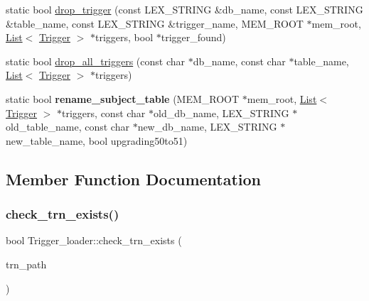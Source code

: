 \begin{DoxyCompactItemize}
\item 
static bool \mbox{\hyperlink{classTrigger__loader_af096f75cbf2411b74572fa71fa2f6612}{drop\+\_\+trigger}} (const L\+E\+X\+\_\+\+S\+T\+R\+I\+NG \&db\+\_\+name, const L\+E\+X\+\_\+\+S\+T\+R\+I\+NG \&table\+\_\+name, const L\+E\+X\+\_\+\+S\+T\+R\+I\+NG \&trigger\+\_\+name, M\+E\+M\+\_\+\+R\+O\+OT $\ast$mem\+\_\+root, \mbox{\hyperlink{classList}{List}}$<$ \mbox{\hyperlink{classTrigger}{Trigger}} $>$ $\ast$triggers, bool $\ast$trigger\+\_\+found)
\item 
static bool \mbox{\hyperlink{classTrigger__loader_a0ac0a2bcb6a58a137bfaabc3380b2ca3}{drop\+\_\+all\+\_\+triggers}} (const char $\ast$db\+\_\+name, const char $\ast$table\+\_\+name, \mbox{\hyperlink{classList}{List}}$<$ \mbox{\hyperlink{classTrigger}{Trigger}} $>$ $\ast$triggers)
\item 
\mbox{\label{classTrigger__loader_a8fab2678add342478649779e065f48b6}} 
static bool {\bfseries rename\+\_\+subject\+\_\+table} (M\+E\+M\+\_\+\+R\+O\+OT $\ast$mem\+\_\+root, \mbox{\hyperlink{classList}{List}}$<$ \mbox{\hyperlink{classTrigger}{Trigger}} $>$ $\ast$triggers, const char $\ast$old\+\_\+db\+\_\+name, L\+E\+X\+\_\+\+S\+T\+R\+I\+NG $\ast$old\+\_\+table\+\_\+name, const char $\ast$new\+\_\+db\+\_\+name, L\+E\+X\+\_\+\+S\+T\+R\+I\+NG $\ast$new\+\_\+table\+\_\+name, bool upgrading50to51)
\end{DoxyCompactItemize}


\subsection{Member Function Documentation}
\mbox{\label{classTrigger__loader_a4c302b0917c9d536dcb568cde72870e9}} 
\subsubsection{\texorpdfstring{check\+\_\+trn\+\_\+exists()}{check\_trn\_exists()}}
{\footnotesize\ttfamily bool Trigger\+\_\+loader\+::check\+\_\+trn\+\_\+exists (\begin{DoxyParamCaption}\item[{const L\+E\+X\+\_\+\+S\+T\+R\+I\+NG \&}]{trn\+\_\+path }\end{DoxyParamCaption})\hspace{0.3cm}{\ttfamily [static]}}

